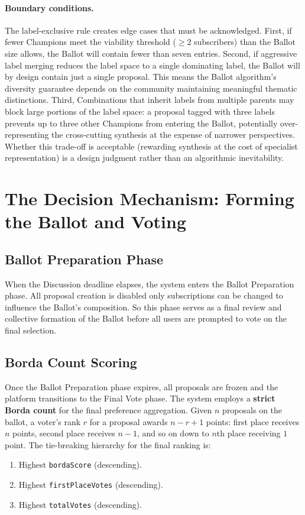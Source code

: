 \documentclass[a4paper, 12pt, twoside]{iviathesis}
\begin{document}


\paragraph{Boundary conditions.}
The label-exclusive rule creates edge cases that must be acknowledged. First, if fewer Champions meet the viability threshold ($\geq 2$ subscribers) than the Ballot size allows, the Ballot will contain fewer than seven entries. Second, if aggressive label merging reduces the label space to a single dominating label, the Ballot will by design contain just a single proposal. This means the Ballot algorithm's diversity guarantee depends on the community maintaining meaningful thematic distinctions. Third, Combinations that inherit labels from multiple parents may block large portions of the label space: a proposal tagged with three labels prevents up to three other Champions from entering the Ballot, potentially over-representing the cross-cutting synthesis at the expense of narrower perspectives. Whether this trade-off is acceptable (rewarding synthesis at the cost of specialist representation) is a design judgment rather than an algorithmic inevitability.

\section{The Decision Mechanism: Forming the Ballot and Voting}
\label{sec:decision-mechanism}

\subsection{Ballot Preparation Phase}
When the Discussion deadline elapses, the system enters the Ballot Preparation phase. All proposal creation is disabled only subscriptions can be changed to influence the Ballot's composition. So this phase serves as a final review and collective formation of the Ballot before all users are prompted to vote on the final selection.

\subsection{Borda Count Scoring}
\label{sec:voting-phase}
Once the Ballot Preparation phase expires, all proposals are frozen and the platform transitions to the Final Vote phase. The system employs a \textbf{strict Borda count} \cite{borda1781} for the final preference aggregation. Given $n$ proposals on the ballot, a voter's rank $r$ for a proposal awards $n - r + 1$ points: first place receives $n$ points, second place receives $n - 1$, and so on down to $n$th place receiving $1$ point. The tie-breaking hierarchy for the final ranking is:
\begin{enumerate}
    \item Highest \texttt{bordaScore} (descending).
    \item Highest \texttt{firstPlaceVotes} (descending).
    \item Highest \texttt{totalVotes} (descending).
\end{enumerate}
\end{document}
